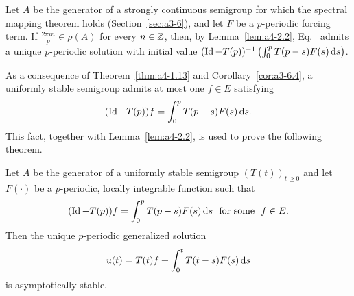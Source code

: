 \begin{remark}\label{rem:a4-2.3}
Let $A$ be the generator of a strongly continuous semigroup for which the spectral mapping theorem holds (Section~\ref{sec:a3-6}), and let $F$ be a $p$-periodic forcing term.
If\/ $\frac{2\pi in}{p} \in \rho(A)$ for every $n \in \mathbb{Z}$, then, by Lemma~\ref{lem:a4-2.2}, Eq.~
admits a unique $p$-periodic solution with initial value $(\operatorname{Id} - T(p))^{-1} \left(\int_{0}^{p} T(p-s)F(s)  \mathop{}\!\mathrm{d}{s}\right)$.
\end{remark}
As a consequence of Theorem~\ref{thm:a4-1.13}  and Corollary~\ref{cor:a3-6.4},  a uniformly stable semigroup admits at most one $f \in E$ satisfying 
\[
(\operatorname{Id}-T(p))f = \int_{0}^{p} T(p-s)F(s)  \mathop{}\!\mathrm{d}{s} .
\]
This fact, together with Lemma~\ref{lem:a4-2.2}, is used to prove the following theorem.
\begin{theorem}\label{thm:a4-2.4}
Let $A$ be the generator of a uniformly stable semigroup $(T(t))_{t \geq 0}$ and let $F(\cdot)$ be a $p$-periodic, locally integrable function such that 
\[{
(\operatorname{Id} - T(p))f = \int_{0}^{p} T(p-s)F(s)  \mathop{}\!\mathrm{d}{s} \ \text{ for some } \ f \in E .
}
\]
Then the unique $p$-periodic generalized solution
\[
u(t) = T(t)f + \int_{0}^{t} T(t-s)F(s)  \mathop{}\!\mathrm{d}{s}
\]
is asymptotically stable. 
\end{theorem}
